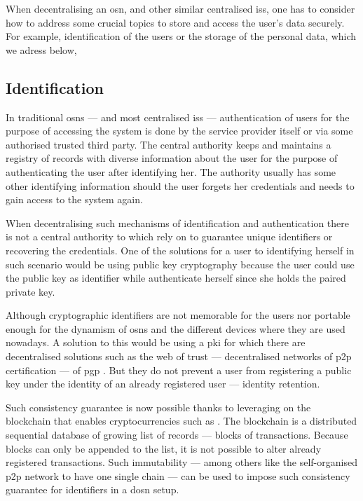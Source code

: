 When decentralising an \ac{osn}, and other similar centralised \acp{is}, one has 
to consider how to address some crucial topics to store and access the user's data 
securely. For example, identification of the users or the storage of the personal 
data, which we adress below, 

\subsection{Identification}
    \label{subsection:thesis:indentification}
In traditional \acp{osn} --- and most centralised \acp{is} 
--- authentication of users for the purpose of accessing the system is done by the 
service provider itself or via some authorised trusted third party. The central 
authority keeps and maintains a registry of records with diverse information about 
the user for the purpose of authenticating the user after identifying her. The authority 
usually has some other identifying information should the user forgets her credentials 
and needs to gain access to the system again.

When decentralising such mechanisms of identification and authentication there is 
not a central authority to which rely on to guarantee unique identifiers or recovering 
the credentials. One of the solutions for a user to identifying herself in such 
scenario would be using public key cryptography because the user could use the public 
key as identifier while authenticate herself since she holds the paired private key. 

Although cryptographic identifiers are not memorable for the users nor portable 
enough for the dynamism of \acp{osn} and the different devices where they are used 
nowadays. A solution to this would be using a \ac{pki} for which there are decentralised 
solutions such as the web of trust ---  decentralised networks of \ac{p2p} certification 
--- of \ac{pgp} \cite{Stallings95, Abdul97}. But they do not prevent a user from 
registering a public key under the identity of an already registered user --- identity 
retention. 

Such consistency guarantee is now possible thanks to leveraging on the blockchain 
that enables cryptocurrencies such as \Bitcoin \cite{Nakamoto08}. The blockchain 
is a distributed sequential database of growing list of records --- blocks of transactions. 
Because blocks can only be appended to the list, it is not possible to alter already 
registered transactions. Such immutability --- among others like the self-organised 
\ac{p2p} network to have one single chain --- can be used to impose such consistency 
guarantee for identifiers in a \ac{dosn} setup.

